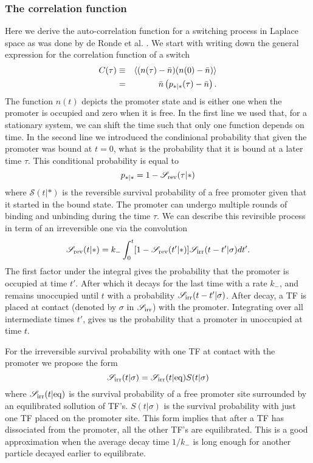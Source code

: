 \subsubsection{The correlation function}
Here we derive the auto-correlation function for a switching process in Laplace space as was done by de Ronde et al. \cite{DeRonde2012}. We start with writing down the general expression for the correlation function of a switch
\begin{eqnarray}
 C(\tau) & \equiv & \left\langle (n(\tau) - \bar{n})(n(0) - \bar{n}) \right\rangle \\
  	& = & \bar{n} \left( p_{*|*}(\tau)-\bar{n} \right).
 \elabel{corr_func}
\end{eqnarray}
The function $n(t)$ depicts the promoter state and is either one when the promoter is occupied and zero when it is free. In the first line we used that, for a stationary system, we can shift the time such that only one function depends on time. In the second line we introduced the condinional probability that given the promoter was bound at $t=0$, what is the probability that it is bound at a later time $\tau$. This conditional probability is equal to
\begin{equation}
 p_{*|*} = 1 - \mathscr{S}_{\rm rev}(\tau|*)
\end{equation}
where $\mathscr{S}(t|*)$ is the reversible survival probability of a free promoter given that it started in the bound state. The promoter can undergo multiple rounds of binding and unbinding during the time $\tau$. We can describe this revirsible process in term of an irreversible one via the convolution \cite{Agmon1990}
\begin{equation}
 \mathscr{S}_{\rm rev}(t|*) = k_- \int_0^t [1-\mathscr{S}_{\rm rev}(t'|*)]\mathscr{S}_{\rm irr}(t-t'|\sigma)dt'.
 \elabel{rev_conv}
\end{equation}
The first factor under the integral gives the probability that the promoter is occupied at time $t'$. After which it decays for the last time with a rate $k_-$, and remains unoccupied until $t$ with a probability $\mathscr{S}_{\rm irr}(t-t'|\sigma)$. After decay, a TF is placed at contact (denoted by $\sigma$ in $\mathscr{S}_{\rm irr}$) with the promoter. Integrating over all intermediate times $t'$, gives us the probability that a promoter in unoccupied at time $t$. 

For the irreversible survival probability with one TF at contact with the promoter we propose the form
\begin{equation}
 \mathscr{S}_{\rm irr}(t|\sigma) = \mathscr{S}_{\rm irr}(t|{\rm eq}) S(t|\sigma)
 \elabel{Def_Ssi}
\end{equation}
where $\mathscr{S}_{\rm irr}(t|{\rm eq})$ is the survival probability of a free promoter site surrounded by an equilibrated sollution of TF's. $S(t|\sigma)$ is the survival probability with just one TF placed on the promoter site. This form implies that after a TF has dissociated from the promoter, all the other TF's are equilibrated. This is a good approximation when the average decay time $1/k_-$ is long enough for another particle decayed earlier to equilibrate. 


